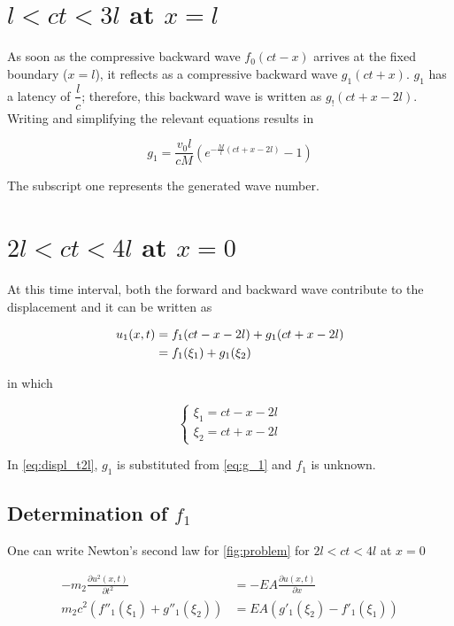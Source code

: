 \documentclass{article}
\begin{document}
\section{$l < ct < 3l$ at $x=l$}
As soon as the compressive backward wave $f_0(ct-x)$ arrives at the fixed boundary ($x=l$), it reflects as a compressive backward wave $g_1(ct+x)$. $g_1$ has a latency of $\dfrac{l}{c}$; therefore, this backward wave is written as $g_!(ct+x-2l)$. Writing and simplifying the relevant equations results in

\begin{equation}
    g_1 = \frac{v_0 l}{c M} \left( e^{-\textstyle\frac{M}{l}(ct+x-2l)} - 1 \right )
    \label{eq:g_1}
\end{equation}

The subscript one represents the generated wave number. 

\section{$2l < ct < 4l$ at $x=0$}
At this time interval, both the forward and backward wave contribute to the displacement and it can be written as

\begin{align}
    u_1(x, t) & = f_1(ct-x-2l) + g_1(ct+x-2l) \notag\\
    & = f_1(\xi_1) + g_1(\xi_2)
    \label{eq:displ_t2l}
\end{align}

in which

\begin{equation*}
    \left\{\begin{matrix}
        \xi_1 = ct - x - 2l\\ 
        \xi_2 = ct + x - 2l
    \end{matrix}\right.
\end{equation*}

In \cref{eq:displ_t2l}, $g_1$ is substituted from \cref{eq:g_1} and $f_1$ is unknown.

\subsection{Determination of $f_1$}
One can write Newton's second law for \cref{fig:problem} for $2l < ct < 4l$ at $x=0$

\begin{align*}
    -m_2 \frac{\partial u^2(x, t)}{\partial t^2} &= -E A \frac{\partial u(x, t)}{\partial x} \\
    m_2 c^2 (f''_1(\xi_1) + g''_1(\xi_2)) &= EA (g'_1(\xi_2) - f'_1(\xi_1))
\end{align*}
\end{document}
